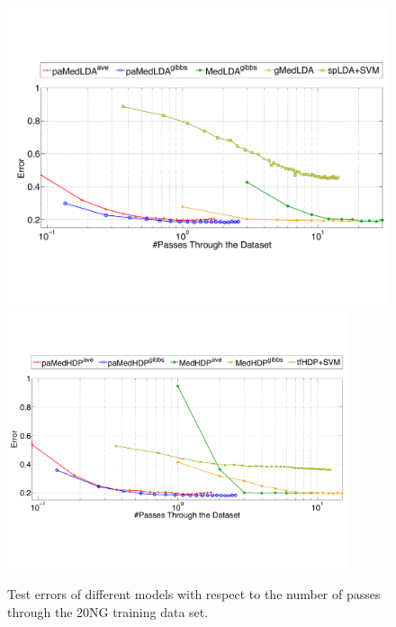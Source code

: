 \documentclass[twoside,11pt]{article}
\begin{document}
\begin{figure}[t]
\begin{center}
\includegraphics[width = .9\textwidth]{plot_multic_commit_lda_jmlr.pdf}
\includegraphics[width = 0.89\textwidth]{plot_multic_commit_hdp_jmlr.pdf}
\end{center}\vspace*{-0.2cm}
\caption{Test errors of different models with respect to the number of passes through the 20NG training data set. }
\vspace*{-0.2cm}
\label{fg:multic_commit}
\end{figure}
\end{document}
